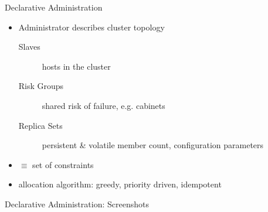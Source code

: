 \documentclass[11pt,aspectratio=169]{beamer}
\begin{document}
    \begin{frame}{Declarative Administration}
        
        \begin{itemize}
           \item<1-> Administrator describes cluster topology
               \begin{description}
                   \item[Slaves] hosts in the cluster
                   \item[Risk Groups] shared risk of failure, e.g. cabinets
                   \item[Replica Sets] persistent \& volatile member count, configuration parameters
                \end{description}
           \item<2-> $\equiv$ set of constraints
           \item<3-> allocation algorithm: \alert<3>{greedy}, \alert<4>{priority driven}, \alert<5>{idempotent}
        \end{itemize}
       
        
    \end{frame}
    
    
    \begin{frame}[allowframebreaks]{Declarative Administration: Screenshots}
         \framebreak
         \framebreak
         \framebreak
    \end{frame}
    
\end{document}
